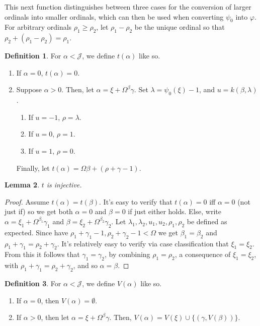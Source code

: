 \documentclass{article}
\theoremstyle{definition}
\newtheorem{definition}{Definition}[section]
\theoremstyle{plain}
\theoremstyle{plain}
\theoremstyle{plain}
\theoremstyle{plain}
\theoremstyle{remark}
\theoremstyle{remark}
\theoremstyle{remark}
\theoremstyle{plain}
\newtheorem{lemma}[definition]{Lemma}
\theoremstyle{plain}
\begin{document}
This next function distinguishes between three cases for the conversion of larger ordinals into smaller ordinals, which can then be used when converting $\psi_0$ into $\varphi$. For arbitrary ordinals $\rho_1 \geq \rho_2$, let $\rho_1 - \rho_2$ be the unique ordinal so that $\rho_2 + (\rho_1 - \rho_2) = \rho_1$.

\begin{definition}
For $\alpha < \mathcal{J}$, we define $t(\alpha)$ like so.

\begin{enumerate}
    \item If $\alpha = 0$, $t(\alpha) = 0$.
    \item Suppose $\alpha > 0$. Then, let $\alpha = \xi + \Omega^\beta \gamma$. Set $\lambda = \psi_0(\xi) - 1$, and $u = k(\beta, \lambda)$.
    \begin{enumerate}
        \item If $u = -1$, $\rho = \lambda$. 
        \item If $u = 0$, $\rho = 1$.
        \item If $u = 1$, $\rho = 0$.
    \end{enumerate}
    Finally, let $t(\alpha) = \Omega \beta + (\rho + \gamma - 1)$.
\end{enumerate}
\end{definition}

\begin{lemma}
$t$ is injective.
\end{lemma}

\begin{proof}
Assume $t(\alpha) = t(\beta)$. It's easy to verify that $t(\alpha) = 0$ iff $\alpha = 0$ (not just if) so we get both $\alpha = 0$ and $\beta = 0$ if just either holds. Else, write $\alpha = \xi_1 + \Omega^{\beta_1} \gamma_1$ and $\beta = \xi_2 + \Omega^{\beta_2} \gamma_2$. Let $\lambda_1, \lambda_2, u_1, u_2, \rho_1, \rho_2$ be defined as expected. Since have $\rho_1 + \gamma_1 - 1, \rho_2 + \gamma_2 - 1 < \Omega$ we get $\beta_1 = \beta_2$ and $\rho_1 + \gamma_1 = \rho_2 + \gamma_2$. It's relatively easy to verify via case classification that $\xi_1 = \xi_2$. From this it follows that $\gamma_1 = \gamma_2$, by combining $\rho_1 = \rho_2$, a consequence of $\xi_1 = \xi_2$, with $\rho_1 + \gamma_1 = \rho_2 + \gamma_2$, and so $\alpha = \beta$.
\end{proof}

\begin{definition}
For $\alpha < \mathcal{J}$, we define $V(\alpha)$ like so.
\begin{enumerate}
    \item If $\alpha = 0$, then $V(\alpha) = \emptyset$.
    \item If $\alpha > 0$, then let $\alpha = \xi+\Omega^\beta \gamma$. Then, $V(\alpha) = V(\xi) \cup \{(\gamma, V(\beta))\}$.
\end{enumerate}
\end{definition}
\end{document}
